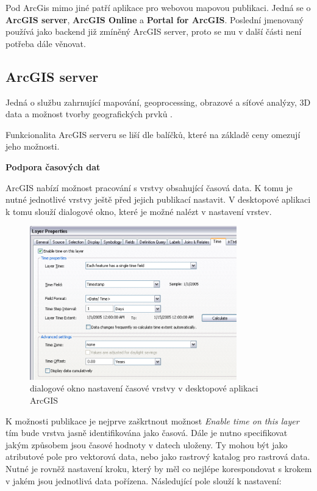 Pod ArcGis mimo jiné patří aplikace pro webovou mapovou publikaci. Jedná se o \textbf{ArcGIS server}, \textbf{ArcGIS Online} a \textbf{Portal for ArcGIS}. Poslední jmenovaný používá jako backend již zmíněný ArcGIS server, proto se mu v další části není potřeba dále věnovat.

\newpage
\subsection{ArcGIS server}

Jedná o službu zahrnující mapování, geoprocessing, obrazové a síťové analýzy, 3D data a možnost tvorby geografických prvků \cite{arcgis-publishing-service}. 

Funkcionalita ArcGIS serveru se liší dle balíčků, které na základě ceny omezují jeho možnosti.   

\bigskip
\noindent
\textbf{Podpora časových dat}
 
ArcGIS nabízí možnost pracování s vrstvy obsahující časová data. K tomu je nutné jednotlivé vrstvy ještě před jejich publikací nastavit. V desktopové aplikaci k tomu slouží dialogové okno, které je možné nalézt v nastavení vrstev.

\begin{figure}[h!]
	\centering
	\includegraphics[width=0.8\textwidth]{../img/arcgis-layer-edit.png}
	\caption{dialogové okno nastavení časové vrstvy v desktopové aplikaci ArcGIS}
	\label{fig:arcgis-time-settings}
\end{figure}

K možnosti publikace je nejprve zaškrtnout možnost \textit{Enable time on this layer} tím bude vrstva jasně identifikována jako časová. Dále je nutno specifikovat jakým způsobem jsou časové hodnoty v datech uloženy. Ty mohou být jako atributové pole pro vektorová data, nebo jako rastrový katalog pro rastrová data. Nutné je rovněž nastavení kroku, který by měl co nejlépe korespondovat s krokem v jakém jsou jednotlivá data pořízena. Následující pole slouží k nastavení:

